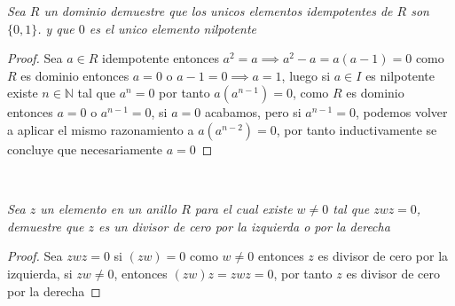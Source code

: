 \documentclass[11pt,letterpaper]{article}
\newcommand{\N}{\mathbb{N}}
\begin{document}
\begin{tcolorbox}[
	title = \textcolor{black}{\textcolor{white}{Problema 2}},]
\textit{Sea $R$ un dominio demuestre que los unicos elementos idempotentes de $R$ son $\{0,1\}$. y que $0$ es el unico elemento nilpotente
}
\end{tcolorbox}
\begin{proof}
    Sea $a\in R$ idempotente entonces $a^2=a\implies a^2-a=a(a-1)=0$ como $R$ es dominio entonces $a=0$ o $a-1=0\implies a=1$, luego si $a\in I$ es nilpotente existe $n\in \N$ tal que $a^n=0$ por tanto $a(a^{n-1})=0$, como $R$ es dominio
    entonces $a=0$ o $a^{n-1}=0$, si $a=0$ acabamos, pero si $a^{n-1}=0$, podemos volver a aplicar el mismo razonamiento a $a(a^{n-2})=0$, por tanto inductivamente se concluye que necesariamente $a=0$
\end{proof}\,\\

\begin{tcolorbox}[
	title = \textcolor{black}{\textcolor{white}{Problema 3}},]
\textit{Sea $z$ un elemento en un anillo $R$ para el cual existe $w\neq 0$ tal que $zwz=0$, demuestre que $z$ es un divisor de cero por la izquierda o
por la derecha
}
\end{tcolorbox}
\begin{proof}
    Sea $zwz=0$ si $(zw)=0$ como $w\neq 0$ entonces $z$ es divisor de cero por la izquierda, si $zw\neq 0$, entonces $(zw)z=zwz=0$, por tanto $z$ es divisor de cero por la derecha
\end{proof}\,\\
\end{document}
